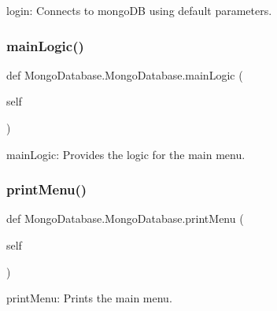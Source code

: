 \begin{DoxyVerb}login: Connects to mongoDB using default parameters. \end{DoxyVerb}
 \hypertarget{class_mongo_database_1_1_mongo_database_a123d046fd01db4d2b342289a972e8e31}{}\label{class_mongo_database_1_1_mongo_database_a123d046fd01db4d2b342289a972e8e31} 
\subsubsection{\texorpdfstring{main\+Logic()}{mainLogic()}}
{\footnotesize\ttfamily def Mongo\+Database.\+Mongo\+Database.\+main\+Logic (\begin{DoxyParamCaption}\item[{}]{self }\end{DoxyParamCaption})}

\begin{DoxyVerb}mainLogic: Provides the logic for the main menu. \end{DoxyVerb}
 \hypertarget{class_mongo_database_1_1_mongo_database_a2eb4c5b675b39a871dfdf03458376363}{}\label{class_mongo_database_1_1_mongo_database_a2eb4c5b675b39a871dfdf03458376363} 
\subsubsection{\texorpdfstring{print\+Menu()}{printMenu()}}
{\footnotesize\ttfamily def Mongo\+Database.\+Mongo\+Database.\+print\+Menu (\begin{DoxyParamCaption}\item[{}]{self }\end{DoxyParamCaption})}

\begin{DoxyVerb}printMenu: Prints the main menu. \end{DoxyVerb}
 \hypertarget{class_mongo_database_1_1_mongo_database_afdd3078ad8bb851bab945b1b477f1529}{}\label{class_mongo_database_1_1_mongo_database_afdd3078ad8bb851bab945b1b477f1529} 
